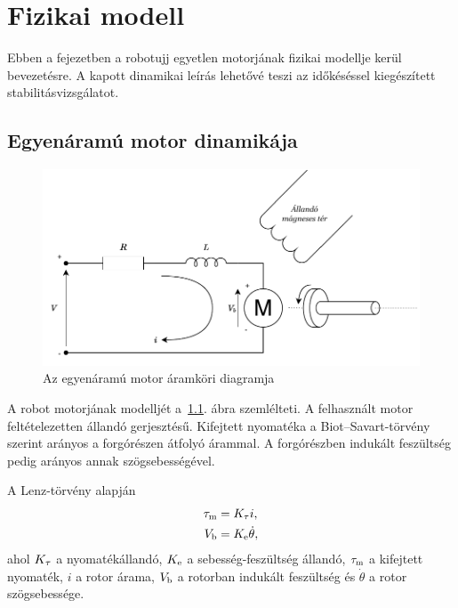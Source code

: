 \chapter{Fizikai modell}\label{chap:physical_system}

Ebben a fejezetben a robotujj \alert{egyetlen}  motorjának fizikai modellje kerül bevezetésre. A kapott dinamikai leírás
lehetővé teszi az időkéséssel kiegészített stabilitásvizsgálatot. 

\section{Egyenáramú motor dinamikája}

\begin{figure}[b!]
\begin{center}
\includegraphics[width=\textwidth]{images/motor_model_electric.pdf}
\caption{Az egyenáramú motor áramköri diagramja}
\label{fig:dc_motor_electric}
\end{center}
\end{figure}

A robot motorjának modelljét a~\ref{fig:dc_motor_electric}. ábra szemlélteti. 
A felhasznált motor feltételezetten állandó gerjesztésű. Kifejtett nyomatéka a 
Biot--Savart-törvény szerint arányos a forgórészen átfolyó árammal. A forgórészben
indukált feszültség pedig arányos annak szögsebességével. 

A Lenz-törvény alapján 
\begin{equation}\label{eq:lenz_torque}
\begin{split}
    \tau_{\mathrm{m}} &= K_{\mathrm{\tau}} i, \\
    V_{\mathrm{b}} &= K_{\mathrm{e}} \dot\theta,
\end{split}
\end{equation}
ahol $K_{\mathrm{\tau}}$ a nyomatékállandó, $K_{\mathrm{e}}$ a sebesség-feszültség állandó, $\tau_{\mathrm{m}}$ a kifejtett 
nyomaték, $i$ a rotor árama, $V_{\mathrm{b}}$ a rotorban indukált feszültség és $\dot\theta$ a rotor szögsebessége.

